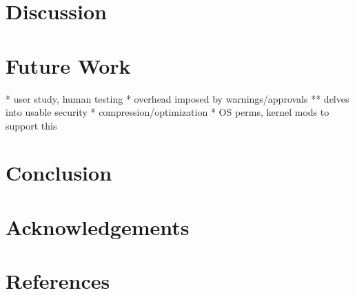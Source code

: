 \documentclass[12pt]{article}
\begin{document}
\section{Discussion}

\section{Future Work}
* user study, human testing
* overhead imposed by warnings/approvals
** delves into usable security
* compression/optimization
* OS perms, kernel mods to support this

\section{Conclusion}

\section{Acknowledgements}

\section{References}



\end{document}
